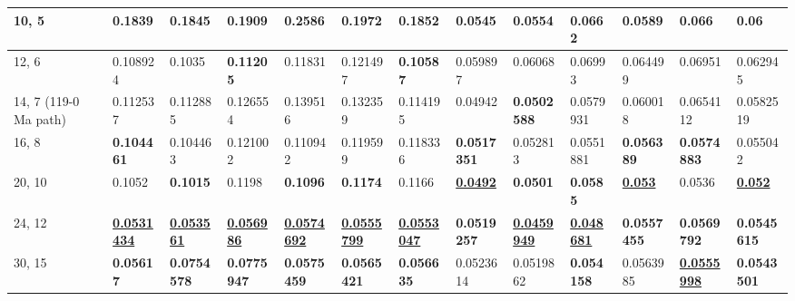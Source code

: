 \begin{table*}
{\begin{tabular}{|l|l|l|l|l|l|l|l|l|l|l|l|l|}
10, 5 & 0.1839 & 0.1845 & 0.1909 & 0.2586 & 0.1972 & 0.1852 &
  0.0545 & 0.0554 & 0.0662 & 0.0589 & 0.066 & 0.06 \\ \hline
12, 6 & 0.108924 & 0.1035 & {\color[HTML]{34FF34} \textbf{0.11205}} & 0.11831 &
  0.121497 & {\color[HTML]{34FF34} \textbf{0.10587}} & 0.059897 & 0.06068 &
  0.06993 & 0.064499 & 0.06951 & 0.062945 \\ \hline
14, 7 (119-0 Ma path) & 0.112537 & 0.112885 & 0.126554 & 0.139516 &
  0.132359 & 0.114195 & 0.04942 & {\color[HTML]{34FF34} \textbf{0.0502588}} & 0.0579931 & 0.060018 & 0.0654112 & 0.0582519 \\ \hline
16, 8 & {\color[HTML]{34FF34} \textbf{0.104461}} & 0.104463 & 0.121002 &
  0.110942 & 0.119599 & 0.118336 & {\color[HTML]{32CB00} \textbf{0.0517351}} &
  0.052813 & 0.0551881 & {\color[HTML]{34FF34} \textbf{0.056389}} & {\color[HTML]{34FF34} \textbf{0.0574883}} & 0.055042 \\ \hline
20, 10 & 0.1052 & {\color[HTML]{34FF34} \textbf{0.1015}} & 0.1198 &
  {\color[HTML]{34FF34} \textbf{0.1096}} & {\color[HTML]{34FF34}
  \textbf{0.1174}} & 0.1166 & {\color[HTML]{009901} {\ul \textbf{0.0492}}} & {\color[HTML]{32CB00} \textbf{0.0501}}
  & {\color[HTML]{32CB00} \textbf{0.0585}} & {\color[HTML]{009901} {\ul
  \textbf{0.053}}} & 0.0536 & {\color[HTML]{009901} {\ul \textbf{0.052}}} \\ \hline
24, 12 & {\color[HTML]{009901} {\ul \textbf{0.0531434}}} & {\color[HTML]{009901} {\ul \textbf{0.053561}}} & {\color[HTML]{009901} {\ul \textbf{0.056986}}} & {\color[HTML]{009901} {\ul \textbf{0.0574692}}} & {\color[HTML]{009901} {\ul \textbf{0.0555799}}} & {\color[HTML]{009901} {\ul \textbf{0.0553047}}} & {\color[HTML]{34FF34} \textbf{0.0519257}} & {\color[HTML]{009901} {\ul
  \textbf{0.0459949}}} & {\color[HTML]{009901} {\ul \textbf{0.048681}}} & {\color[HTML]{32CB00} \textbf{0.0557455}} & {\color[HTML]{32CB00} \textbf{0.0569792}} & {\color[HTML]{34FF34} \textbf{0.0545615}} \\ \hline
30, 15 & {\color[HTML]{32CB00} \textbf{0.05617}} & {\color[HTML]{32CB00} \textbf{0.0754578}} & {\color[HTML]{32CB00} \textbf{0.0775947}} & {\color[HTML]{32CB00} \textbf{0.0575459}} & {\color[HTML]{32CB00} \textbf{0.0565421}} & {\color[HTML]{32CB00} \textbf{0.056635}} & 0.0523614 & 0.0519862 & {\color[HTML]{34FF34} \textbf{0.054158}} & 0.0563985 & {\color[HTML]{009901} {\ul \textbf{0.0555998}}} & {\color[HTML]{32CB00} \textbf{0.0543501}} \\ \hline
\end{tabular}%
}

\end{table*}
